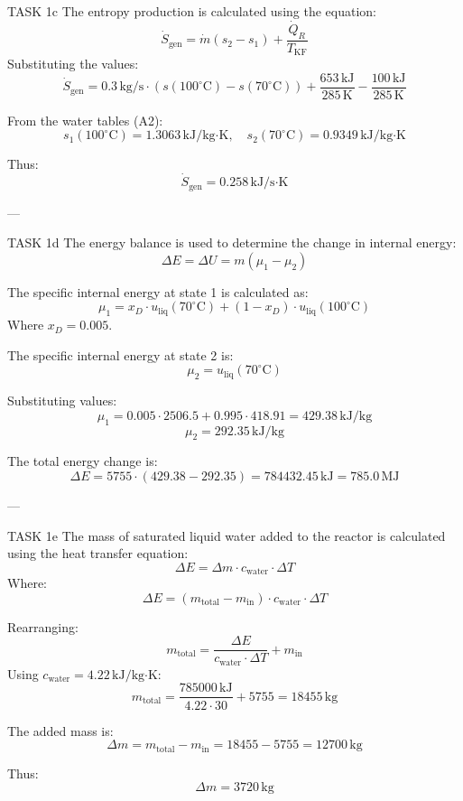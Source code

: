 TASK 1c  
The entropy production is calculated using the equation:  
\[
\dot{S}_{\text{gen}} = \dot{m} (s_2 - s_1) + \frac{\dot{Q}_R}{T_{\text{KF}}}
\]  
Substituting the values:  
\[
\dot{S}_{\text{gen}} = 0.3 \, \text{kg/s} \cdot (s(100^\circ\text{C}) - s(70^\circ\text{C})) + \frac{653 \, \text{kJ}}{285 \, \text{K}} - \frac{100 \, \text{kJ}}{285 \, \text{K}}
\]  

From the water tables (A2):  
\[
s_1(100^\circ\text{C}) = 1.3063 \, \text{kJ/kg·K}, \quad s_2(70^\circ\text{C}) = 0.9349 \, \text{kJ/kg·K}
\]  

Thus:  
\[
\dot{S}_{\text{gen}} = 0.258 \, \text{kJ/s·K}
\]  

---

TASK 1d  
The energy balance is used to determine the change in internal energy:  
\[
\Delta E = \Delta U = m (\mu_1 - \mu_2)
\]  

The specific internal energy at state 1 is calculated as:  
\[
\mu_1 = x_D \cdot u_{\text{liq}}(70^\circ\text{C}) + (1 - x_D) \cdot u_{\text{liq}}(100^\circ\text{C})
\]  
Where \( x_D = 0.005 \).  

The specific internal energy at state 2 is:  
\[
\mu_2 = u_{\text{liq}}(70^\circ\text{C})
\]  

Substituting values:  
\[
\mu_1 = 0.005 \cdot 2506.5 + 0.995 \cdot 418.91 = 429.38 \, \text{kJ/kg}
\]  
\[
\mu_2 = 292.35 \, \text{kJ/kg}
\]  

The total energy change is:  
\[
\Delta E = 5755 \cdot (429.38 - 292.35) = 784432.45 \, \text{kJ} = 785.0 \, \text{MJ}
\]  

---

TASK 1e  
The mass of saturated liquid water added to the reactor is calculated using the heat transfer equation:  
\[
\Delta E = \Delta m \cdot c_{\text{water}} \cdot \Delta T
\]  
Where:  
\[
\Delta E = (m_{\text{total}} - m_{\text{in}}) \cdot c_{\text{water}} \cdot \Delta T
\]  

Rearranging:  
\[
m_{\text{total}} = \frac{\Delta E}{c_{\text{water}} \cdot \Delta T} + m_{\text{in}}
\]  
Using \( c_{\text{water}} = 4.22 \, \text{kJ/kg·K} \):  
\[
m_{\text{total}} = \frac{785000 \, \text{kJ}}{4.22 \cdot 30} + 5755 = 18455 \, \text{kg}
\]  

The added mass is:  
\[
\Delta m = m_{\text{total}} - m_{\text{in}} = 18455 - 5755 = 12700 \, \text{kg}
\]  

Thus:  
\[
\Delta m = 3720 \, \text{kg}
\]